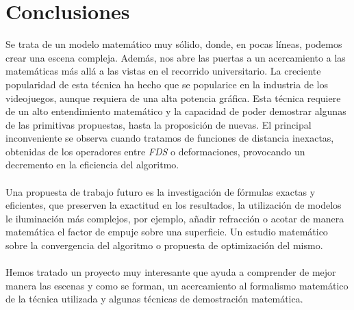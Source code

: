 \chapter{Conclusiones}

Se trata de un modelo matemático muy sólido, donde, en pocas líneas, podemos crear una escena compleja. Además, nos abre las puertas a un acercamiento a las matemáticas más allá a las vistas en el recorrido universitario. La creciente popularidad de esta técnica ha hecho que se popularice en la industria de los videojuegos, aunque requiera de una alta potencia gráfica. Esta técnica requiere de un alto entendimiento matemático y la capacidad de poder demostrar algunas de las primitivas propuestas, hasta la proposición de nuevas. El principal inconveniente se observa cuando tratamos de funciones de distancia inexactas, obtenidas de los operadores entre \textit{FDS} o deformaciones, provocando un decremento en la eficiencia del algoritmo.\\\\
Una propuesta de trabajo futuro es la investigación de fórmulas exactas y eficientes, que preserven la exactitud en los resultados, la utilización de modelos le iluminación más complejos, por ejemplo, añadir refracción o acotar de manera matemática el factor de empuje sobre una superficie. Un estudio matemático sobre la convergencia del algoritmo o propuesta de optimización del mismo.\\\\
Hemos tratado un proyecto muy interesante que ayuda a comprender de mejor manera las escenas y como se forman, un acercamiento al formalismo matemático de la técnica utilizada y algunas técnicas de demostración matemática.